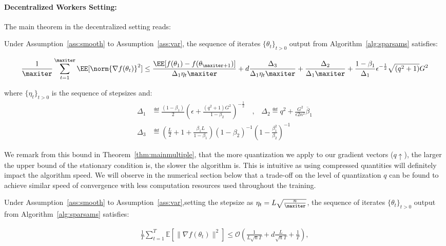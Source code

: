 \documentclass[11pt]{article}
\begin{document}
\paragraph{Decentralized Workers Setting:}

The main theorem in the decentralized setting reads:

\begin{Theorem}\label{thm:mainmultiple}
Under Assumption~\ref{ass:smooth} to Assumption~\ref{ass:var}, the sequence of iterates $\{\theta_t\}_{t>0}$ output from Algorithm~\ref{alg:sparsams} satisfies:

\begin{equation}
\begin{split}
 \frac{1}{\maxiter}\sum_{t=1}^{\maxiter} \EE[\norm{\nabla f(\theta_t)}^2] \leq \frac{\EE[ f(\theta_{1}) - f(\theta_{\maxiter+1})]}{ \Delta_1 \eta_t \maxiter} + 
d\frac{ \Delta_3}{\Delta_1 \eta_t \maxiter}  + \frac{\Delta_2}{ \Delta_1\maxiter} +\frac{1-\beta_1}{\Delta_1}  \epsilon^{-\frac{1}{2}} \sqrt{(q^2+1)}G^2 
\end{split}
\end{equation}


where $\{\eta_t\}_{t>0}$ is the sequence of stepsizes and:
\begin{equation}
\begin{split}
\Delta_1 & \eqdef \frac{(1-\beta_1)}{2} (\epsilon + \frac{(q^2+1)G^2}{1 - \beta_2})^{-\frac{1}{2}} \quad \textrm{,} \quad \Delta_2 \eqdef q^2 + \frac{G^2 }{\epsilon 2n^2}  \overline{\beta}_1\\
\Delta_3 &\eqdef \left(\frac{L}{2} + 1+ \frac{\beta_1L}{1-\beta_1} \right) (1-\beta_2)^{-1} (1 - \frac{\beta_1^{2}}{\beta_2})^{-1}
\end{split}
\end{equation}
\end{Theorem}

We remark from this bound in Theorem~\ref{thm:mainmultiple}, that the more quantization we apply to our gradient vectors ($q \uparrow$), the larger the upper bound of the stationary condition is, \ie the slower the algorithm is. 
This is intuitive as using compressed quantities will definitely impact the algorithm speed.
We will observe in the numerical section below that a trade-off on the level of quantization $q$ can be found to achieve similar speed of convergence with less computation resources used throughout the training.


\begin{Corollary}\label{coro:mainmultiple}
Under Assumption~\ref{ass:smooth} to Assumption~\ref{ass:var},setting the stepsize as $\eta_t = L\sqrt{\frac{n}{\maxiter}}$, the sequence of iterates $\{\theta_t\}_{t>0}$ output from Algorithm~\ref{alg:sparsams} satisfies:

\begin{align*}
    \frac{1}{T}\sum_{t=1}^T \mathbb E[\|\nabla f(\theta_t)\|^2]\leq \mathcal O(\frac{1}{L\sqrt nT}+ d\frac{L}{\sqrt nT}+\frac{1}{T}),
\end{align*}
\end{Corollary}
\end{document}

